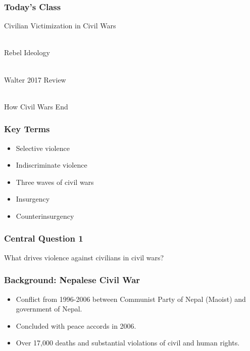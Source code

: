 \documentclass{beamer}
\begin{document}
	\begin{frame} 
	\frametitle{\LARGE{Today's Class}}
	\begin{itemize}
		\Large{
			\item Civilian Victimization in Civil Wars
			\\~\\ 
			\item Rebel Ideology
			\\~\\
			\item Walter 2017 Review
			\\~\\
			\item How Civil Wars End
		}
	\end{itemize}
\end{frame}

\begin{frame} 
	\frametitle{\LARGE{Key Terms}}
	\begin{itemize}
		\item Selective violence
		\item Indiscriminate violence
		\item Three waves of civil wars
		\item Insurgency
		\item Counterinsurgency
	\end{itemize}
\end{frame}

\begin{frame} 
	\frametitle{\LARGE{Central Question 1}}
	\centering
	\Large{What drives violence against civilians in civil wars?} 
\end{frame}

\begin{frame} 
	\frametitle{\LARGE{Background: Nepalese Civil War}}
	\begin{itemize}
		\item Conflict from 1996-2006 between Communist Party of Nepal (Maoist) and government of Nepal.
		\item Concluded with peace accords in 2006.
		\item Over 17,000 deaths and substantial violations of civil and human rights.
	\end{itemize}
\end{frame}
\end{document}
